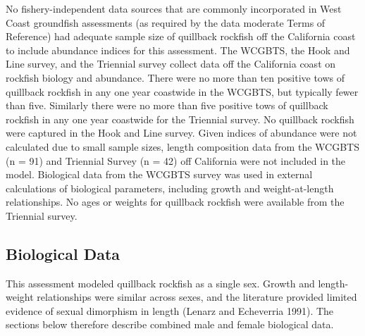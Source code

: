 \documentclass[11pt,
  english,
  a4paper,
]{article}
\begin{document}
\leavevmode\tagmcend\tagstructend


No fishery-independent data sources that are commonly incorporated in West Coast groundfish assessments (as required by the data moderate Terms of Reference) had adequate sample size of quillback rockfish off the California coast to include abundance indices for this assessment. The WCGBTS, the Hook and Line survey, and the Triennial survey collect data off the California coast on rockfish biology and abundance. There were no more than ten positive tows of quillback rockfish in any one year coastwide in the WCGBTS, but typically fewer than five. Similarly there were no more than five positive tows of quillback rockfish in any one year coastwide for the Triennial survey. No quillback rockfish were captured in the Hook and Line survey. Given indices of abundance were not calculated due to small sample sizes, length composition data from the WCGBTS (n = 91) and Triennial Survey (n = 42) off California were not included in the model. Biological data from the WCGBTS survey was used in external calculations of biological parameters, including growth and weight-at-length relationships. No ages or weights for quillback rockfish were available from the Triennial survey.

\leavevmode\tagmcend\tagstructend\par


\hypertarget{biological-data}{%
\subsection{Biological Data}\label{biological-data}}

\leavevmode\tagmcend\tagstructend


This assessment modeled quillback rockfish as a single sex. Growth and length-weight relationships were similar across sexes, and the literature provided limited evidence of sexual dimorphism in length {(Lenarz and Echeverria 1991)\leavevmode\tagmcend\tagstructend}. The sections below therefore describe combined male and female biological data.

\leavevmode\tagmcend\tagstructend\par

\end{document}
